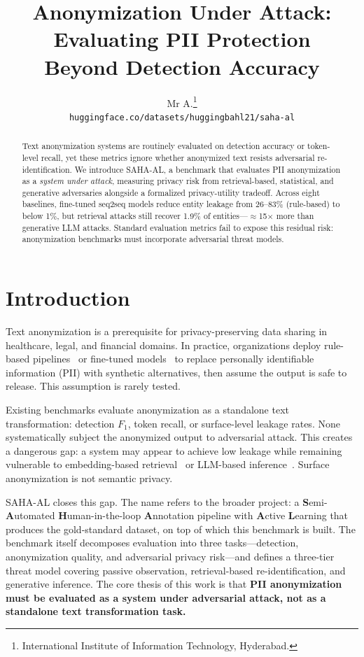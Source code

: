 \documentclass[10pt,twocolumn]{article}
\title{Anonymization Under Attack: Evaluating PII Protection\\Beyond Detection Accuracy}
\author{
  Mr A.\thanks{International Institute of Information Technology, Hyderabad.}
  \\[2pt]
  \texttt{huggingface.co/datasets/huggingbahl21/saha-al}
}
\date{}
\begin{document}
\maketitle

\begin{abstract}
Text anonymization systems are routinely evaluated on detection accuracy or token-level recall, yet these metrics ignore whether anonymized text resists adversarial re-identification.
We introduce SAHA-AL, a benchmark that evaluates PII anonymization as a \emph{system under attack}, measuring privacy risk from retrieval-based, statistical, and generative adversaries alongside a formalized privacy-utility tradeoff.
Across eight baselines, fine-tuned seq2seq models reduce entity leakage from 26--83\% (rule-based) to below 1\%, but retrieval attacks still recover 1.9\% of entities---$\approx$15$\times$ more than generative LLM attacks.
Standard evaluation metrics fail to expose this residual risk: anonymization benchmarks must incorporate adversarial threat models.
\end{abstract}

\section{Introduction}\label{sec:intro}

Text anonymization is a prerequisite for privacy-preserving data sharing in healthcare, legal, and financial domains.
In practice, organizations deploy rule-based pipelines~\citep{presidio2023,spacy2020} or fine-tuned models~\citep{lewis2020bart,raffel2020t5} to replace personally identifiable information (PII) with synthetic alternatives, then assume the output is safe to release.
This assumption is rarely tested.

Existing benchmarks evaluate anonymization as a standalone text transformation: detection $F_1$, token recall, or surface-level leakage rates.
None systematically subject the anonymized output to adversarial attack.
This creates a dangerous gap: a system may appear to achieve low leakage while remaining vulnerable to embedding-based retrieval~\citep{shokri2017} or LLM-based inference~\citep{staab2024}.
Surface anonymization is not semantic privacy.

SAHA-AL closes this gap.
The name refers to the broader project: a \textbf{S}emi-\textbf{A}utomated \textbf{H}uman-in-the-loop \textbf{A}nnotation pipeline with \textbf{A}ctive \textbf{L}earning that produces the gold-standard dataset, on top of which this benchmark is built.
The benchmark itself decomposes evaluation into three tasks---detection, anonymization quality, and adversarial privacy risk---and defines a three-tier threat model covering passive observation, retrieval-based re-identification, and generative inference.
The core thesis of this work is that \textbf{PII anonymization must be evaluated as a system under adversarial attack, not as a standalone text transformation task.}
\end{document}
